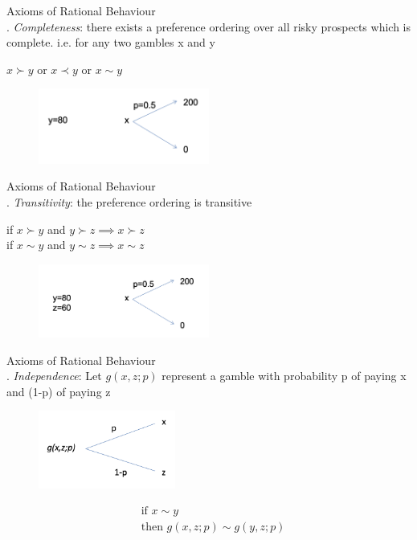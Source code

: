 \documentclass[
14pt,notheorems,hyperref={pdfauthor=whatever}
]{beamer}
\begin{document}
\begin{frame}
Axioms of Rational Behaviour\\
\hfill {}. \textit{Completeness}: there exists a preference ordering over all risky prospects which is complete. i.e. for any two gambles x and y\\
\begin{center}
    $x \succ y$ or $x \prec y$ or $x \sim y$
\end{center}
\begin{figure}[ut1]
    \includegraphics[width=0.5\textwidth]{L1UT1}
    \centering
\end{figure}
\end{frame}

\begin{frame}
Axioms of Rational Behaviour\\
\hfill {}. \textit{Transitivity}: the preference ordering is transitive\\
\begin{center}
    if $x \succ y$ and $y \succ z \implies x \succ z$\\
    if $x \sim y$ and $y \sim z \implies x \sim z$
\end{center}
\begin{figure}[ut2]
    \includegraphics[width=0.5\textwidth]{L1UT2}
    \centering
\end{figure}
\end{frame}

\begin{frame}
Axioms of Rational Behaviour\\
\hfill {}. \textit{Independence}: Let $g(x,z;p)$ represent a gamble with probability p of paying x and (1-p) of paying z\\
\begin{figure}[ut3]
    \includegraphics[width=0.4\textwidth]{L1UT3}
    \centering
\end{figure}
\begin{align*}
    &\textrm{if } x \sim y\\
    &\textrm{then } g(x,z;p) \sim g(y,z;p)
\end{align*}
\end{frame}
\end{document}
